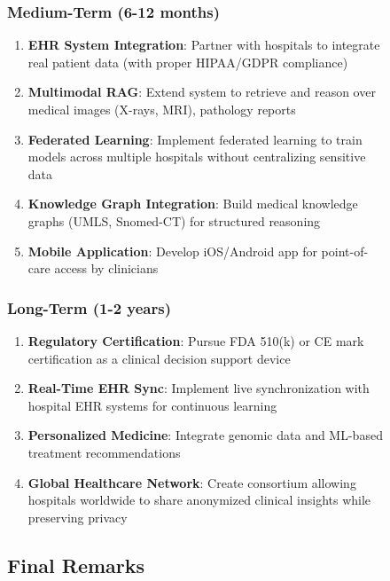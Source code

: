 \documentclass[12pt,singleside,a4paper]{article}
\begin{document}
\begin{figure}[H]
\subsubsection{Medium-Term (6-12 months)}

\begin{enumerate}
\item \textbf{EHR System Integration}: Partner with hospitals to integrate real patient data (with proper HIPAA/GDPR compliance)

\item \textbf{Multimodal RAG}: Extend system to retrieve and reason over medical images (X-rays, MRI), pathology reports

\item \textbf{Federated Learning}: Implement federated learning to train models across multiple hospitals without centralizing sensitive data

\item \textbf{Knowledge Graph Integration}: Build medical knowledge graphs (UMLS, Snomed-CT) for structured reasoning

\item \textbf{Mobile Application}: Develop iOS/Android app for point-of-care access by clinicians
\end{enumerate}

\subsubsection{Long-Term (1-2 years)}

\begin{enumerate}
\item \textbf{Regulatory Certification}: Pursue FDA 510(k) or CE mark certification as a clinical decision support device

\item \textbf{Real-Time EHR Sync}: Implement live synchronization with hospital EHR systems for continuous learning

\item \textbf{Personalized Medicine}: Integrate genomic data and ML-based treatment recommendations

\item \textbf{Global Healthcare Network}: Create consortium allowing hospitals worldwide to share anonymized clinical insights while preserving privacy
\end{enumerate}

\subsection{Final Remarks}


\end{figure}
\end{document}
